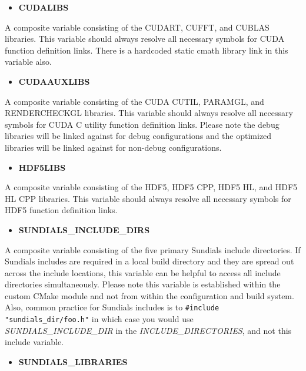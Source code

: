 \documentclass[12pt,letterpaper]{article}
\begin{document}
\begin{itemize}
\item \textbf{CUDALIBS}
\end{itemize}

A composite variable consisting of the CUDART, CUFFT, and CUBLAS libraries.  This variable should always resolve all necessary symbols for CUDA function definition links.  There is a hardcoded static cmath library link in this variable also.

\begin{itemize}
\item \textbf{CUDAAUXLIBS}
\end{itemize}

A composite variable consisting of the CUDA CUTIL, PARAMGL, and RENDERCHECKGL libraries.  This variable should always resolve all necessary symbols for CUDA C utility function definition links.  Please note the debug libraries will be linked against for debug configurations and the optimized libraries will be linked against for non-debug configurations.

\begin{itemize}
\item \textbf{HDF5LIBS}
\end{itemize}

A composite variable consisting of the HDF5, HDF5 CPP, HDF5 HL, and HDF5 HL CPP libraries.  This variable should always resolve all necessary symbols for HDF5 function definition links.

\begin{itemize}
\item \textbf{SUNDIALS\_INCLUDE\_DIRS}
\end{itemize}

A composite variable consisting of the five primary Sundials include directories.  If Sundials includes are required in a local build directory and they are spread out across the include locations, this variable can be helpful to access all include directories simultaneously.  Please note this variable is established within the custom CMake module and not from within the configuration and build system.  Also, common practice for Sundials includes is to \verb|#include "sundials_dir/foo.h"| in which case you would use \emph{SUNDIALS\_INCLUDE\_DIR} in the \emph{INCLUDE\_DIRECTORIES}, and not this include variable.

\begin{itemize}
\item \textbf{SUNDIALS\_LIBRARIES}
\end{itemize}
\end{document}
